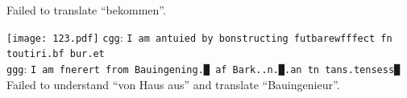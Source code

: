 \documentclass[11pt,twocolumn]{article}
\begin{document}
\vspace{-0.8em}
Failed to translate ``bekommen''.

\vspace{1.2em}\noindent\texttt{[image: 123.pdf]}
\texttt{cgg}: \texttt{I am antuied by bonstructing futbarewfffect fn toutiri.bf bur.et}\\
\texttt{ggg}: \texttt{I am fnerert from Bauingening.█ af Bark..n.█.an tn tans.tensess█}\\

\vspace{-0.8em}
Failed to understand ``von Haus aus'' and translate ``Bauingenieur''.






\end{document}
